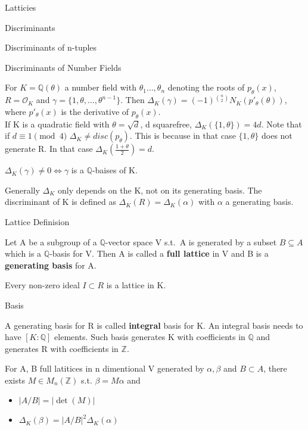 \documentclass[12pt, letterpaper]{article}
\newcommand{\Q}{\mathbb{Q}}
\newcommand{\Z}{\mathbb{Z}}
\newcommand{\Ok}{\mathcal{O}}
\begin{document}
\begin{section}{Latticies}
\begin{subsection}{Discriminants}
\begin{subsubsection}{Discriminants of n-tuples}
    \end{subsubsection}

    \begin{subsubsection}{Discriminants of Number Fields}

      For \(K = \Q(\theta)\) a number field with \(\theta_{1} \dots ,
      \theta_{n}\) denoting the roots of \(p_{\theta}(x)\), \(R = \Ok_{K}\) and
      \(\gamma = \{ 1, \theta, \dots , \theta^{n - 1}\}\). Then
      \(\Delta_{K}(\gamma) = (-1){}^{{n}\choose{2}} N_{K}(p'_{\theta}
      (\theta))\), where \(p'_{\theta}(x)\) is the derivative of
      \(p_{\theta}(x)\). \\
      If K is a quadratic field with \(\theta = \sqrt{d}\), d squarefree,
      \(\Delta_{K}(\{ 1, \theta \}) = 4d\). Note that if \(d \equiv 1 \pmod{4}\)
      \(\Delta_{K} \neq disc(p_{\theta})\). This is because in that case
      \(\{ 1, \theta \}\) does not generate R. In that case \(\Delta_{K}(
      \frac{1 + \theta}{2}) = d\).

      \(\Delta_{K}(\gamma) \neq 0 \iff \gamma\) is a \(\Q\)-baises of K.

      Generally \(\Delta_{K}\) only depends on the K, not on its generating
      basis. The discriminant of K is defined as \(\Delta_{K}(R) =
      \Delta_{K}(\alpha)\) with \(\alpha\) a generating basis.

    \end{subsubsection}

  \end{subsection}

  \begin{subsection}{Lattice Definision}

    Let A be a subgroup of a \(\Q\)-vector space V s.t.\ A is generated by a
    subset \(B \subseteq A\) which is a \(\Q\)-basis for V. Then A is called a
    \textbf{full lattice} in V and B is a \textbf{generating basis} for A.

    Every non-zero ideal \(I \subset R\) is a lattice in K.

  \end{subsection}

  \begin{subsection}{Basis}

    A generating basis for R is called \textbf{integral} basis for K. An
    integral basis needs to have \([K : \Q]\) elements. Such basis generates
    K with coefficients in \(\Q\) and generates R with coefficients in \(\Z\).

    For A, B full latitices in n dimentional V generated by \(\alpha, \beta\)
    and \(B \subset A\), there exists \(M \in M_{n}(\Z)\) s.t.
    \(\beta = M \alpha\) and
    \begin{itemize}
      \item \(| A / B | = | \det(M) |\)
      \item \(\Delta_{K}(\beta) = | A / B |^{2} \Delta_{K}(\alpha)
            \label{BAS}\)
    \end{itemize}


\end{subsection}
\end{section}
\end{document}
